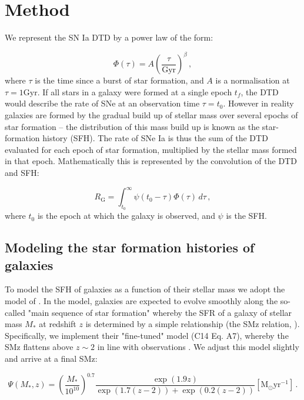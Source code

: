 \documentclass[fleqn,usenatbib]{mnras}
\begin{document}
\section{Method \label{sec:method}}

We represent the SN Ia DTD by a power law of the form:

\begin{equation}
    \Phi(\tau) = A\left(\frac{\tau}{\mathrm{Gyr}}\right)^{\beta}\,,
\end{equation} 
where $\tau$ is the time since a burst of star formation, and $A$ is a normalisation at $\tau=1\mathrm{Gyr}$. If all stars in a galaxy were formed at a single epoch $t_f$, the DTD would describe the rate of SNe at an observation time $\tau = t_0$. However in reality galaxies are formed by the gradual build up of stellar mass over several epochs of star formation -- the distribution of this mass build up is known as the star-formation history (SFH). The rate of SNe Ia is thus the sum of the DTD evaluated for each epoch of star formation, multiplied by the stellar mass formed in that epoch. Mathematically this is represented by the convolution of the DTD and SFH:
 
 
\begin{equation}
    R_{\mathrm{G}} = \int_{t_0}^{\infty} \psi(t_0-\tau)\Phi(\tau)\,d\tau \,,
\end{equation}
where $t_0$ is the epoch at which the galaxy is observed, and $\psi$ is the SFH.

\subsection{Modeling the star formation histories of galaxies \label{subsec:method_sfh}}
To model the SFH of galaxies as a function of their stellar mass we adopt the model of \citet{Childress2014}. In the model, galaxies are expected to evolve smoothly along the so-called "main sequence of star formation" whereby the SFR of a galaxy of stellar mass $M_*$ at redshift $z$ is determined by a simple relationship (the SMz relation, \citealt{Zahid2012}). Specifically, we implement their "fine-tuned" model (C14 Eq. A7), whereby the SMz flattens above $z\sim2$ in line with observations \citep{Stark2013}. We adjust this model slightly and arrive at a final SMz:

\begin{equation}
    \Psi(M_*,z) = \left(\frac{M_*}{10^{10}}\right)^{0.7}\frac{\exp{\left(1.9z\right)}}{\exp{\left(1.7\left(z-2\right)\right)} + \exp{\left(0.2\left(z-2\right)\right)} } [\mathrm{M}_{\odot} \mathrm{yr}^{-1}]\,.
\end{equation}
\end{document}
